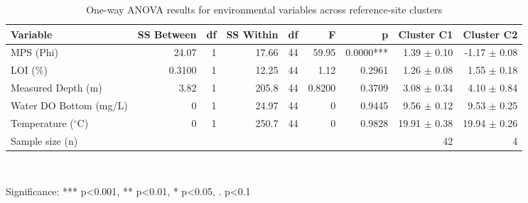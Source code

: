\begin{table}[htbp]
  \centering
  \caption{One-way ANOVA results for environmental variables across reference-site clusters}
  \label{tab:02_taxa_assemblage_anova_env}
  \small
  \begin{tabular}{lrrrrrrrr}
    \toprule
    Variable & SS Between & df & SS Within & df  & F & p & Cluster C1 & Cluster C2 \\
    \midrule
    MPS (Phi) & 24.07 & 1 & 17.66 & 44 & 59.95 & 0.0000*** & 1.39 $\pm$ 0.10 & -1.17 $\pm$ 0.08 \\
    LOI (\%) & 0.3100 & 1 & 12.25 & 44 & 1.12 & 0.2961 & 1.26 $\pm$ 0.08 & 1.55 $\pm$ 0.18 \\
    Measured Depth (m) & 3.82 & 1 & 205.8 & 44 & 0.8200 & 0.3709 & 3.08 $\pm$ 0.34 & 4.10 $\pm$ 0.84 \\
    Water DO Bottom (mg/L) & 0 & 1 & 24.97 & 44 & 0 & 0.9445 & 9.56 $\pm$ 0.12 & 9.53 $\pm$ 0.25 \\
    Temperature ($^{\circ}$C) & 0 & 1 & 250.7 & 44 & 0 & 0.9828 & 19.91 $\pm$ 0.38 & 19.94 $\pm$ 0.26 \\
    Sample size (n) &  &  &  &  &  &  & 42 & 4 \\
    \bottomrule
  \end{tabular}
  \\[4pt]
  \parbox{\textwidth}{\footnotesize Significance: *** p<0.001, ** p<0.01, * p<0.05, . p<0.1}
\end{table}
